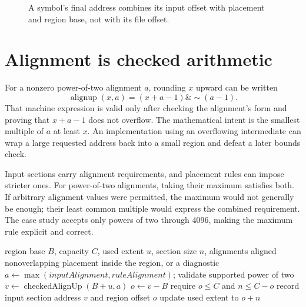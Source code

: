 \begin{figure}[htbp]
\centering
{}
\caption{A symbol's final address combines its input offset with placement and region base, not with its file offset.}
\label{fig:ch58-coordinates}
\end{figure}

\section{Alignment is checked arithmetic}
\label{sec:ch58-alignment}

For a nonzero power-of-two alignment $a$, rounding $x$ upward can be written
\[
 \operatorname{alignup}(x,a)=(x+a-1)\mathbin{\&}\mathop{\sim}(a-1).
\]
That machine expression is valid only after checking the alignment's form and proving that $x+a-1$ does not overflow.
The mathematical intent is the smallest multiple of $a$ at least $x$.
An implementation using an overflowing intermediate can wrap a large requested address back into a small region and defeat a later bounds check.

Input sections carry alignment requirements, and placement rules can impose stricter ones.
For power-of-two alignments, taking their maximum satisfies both.
If arbitrary alignment values were permitted, the maximum would not generally be enough; their least common multiple would express the combined requirement.
The case study accepts only powers of two through 4096, making the maximum rule explicit and correct.

\begin{algorithm}[htbp]
\caption{Place one input section in a bounded region.}
\label{alg:ch58-place}
\begin{pseudocode}
\Require region base $B$, capacity $C$, used extent $u$, section size $n$, alignments
\Ensure aligned nonoverlapping placement inside the region, or a diagnostic
\State $a\gets\max(inputAlignment,ruleAlignment)$; validate supported power of two
\State $v\gets\operatorname{checkedAlignUp}(B+u,a)$
\State $o\gets v-B$
\State require $o\le C$ and $n\le C-o$
\State record input section address $v$ and region offset $o$
  \State update used extent to $o+n$
\EndIf
\end{pseudocode}
\end{algorithm}


